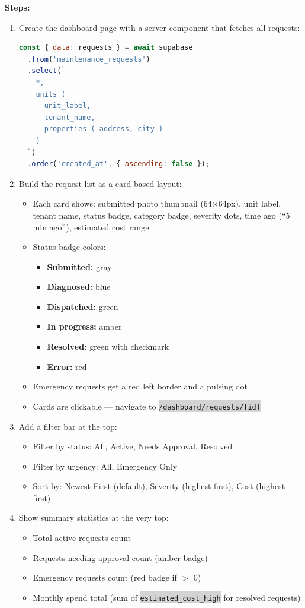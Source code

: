 \documentclass[11pt, a4paper]{article}
\newcommand{\code}[1]{\texttt{\small\colorbox{lightgray}{#1}}}
\begin{document}
\textbf{Steps:}
\begin{enumerate}[leftmargin=2em, itemsep=2pt]
  \item Create the dashboard page with a server component that fetches all requests:
\begin{lstlisting}[language=JavaScript]
const { data: requests } = await supabase
  .from('maintenance_requests')
  .select(`
    *,
    units (
      unit_label,
      tenant_name,
      properties ( address, city )
    )
  `)
  .order('created_at', { ascending: false });
\end{lstlisting}

  \item Build the request list as a card-based layout:
    \begin{itemize}[itemsep=1pt]
      \item Each card shows: submitted photo thumbnail (64$\times$64px), unit label, tenant name, status badge, category badge, severity dots, time ago (``5 min ago''), estimated cost range
      \item Status badge colors:
        \begin{itemize}[itemsep=1pt]
          \item \textbf{Submitted:} gray
          \item \textbf{Diagnosed:} blue
          \item \textbf{Dispatched:} green
          \item \textbf{In progress:} amber
          \item \textbf{Resolved:} green with checkmark
          \item \textbf{Error:} red
        \end{itemize}
      \item Emergency requests get a red left border and a pulsing dot
      \item Cards are clickable --- navigate to \code{/dashboard/requests/[id]}
    \end{itemize}

  \item Add a filter bar at the top:
    \begin{itemize}[itemsep=1pt]
      \item Filter by status: All, Active, Needs Approval, Resolved
      \item Filter by urgency: All, Emergency Only
      \item Sort by: Newest First (default), Severity (highest first), Cost (highest first)
    \end{itemize}

  \item Show summary statistics at the very top:
    \begin{itemize}[itemsep=1pt]
      \item Total active requests count
      \item Requests needing approval count (amber badge)
      \item Emergency requests count (red badge if $>$ 0)
      \item Monthly spend total (sum of \code{estimated\_cost\_high} for resolved requests)
    \end{itemize}
\end{enumerate}
\end{document}
